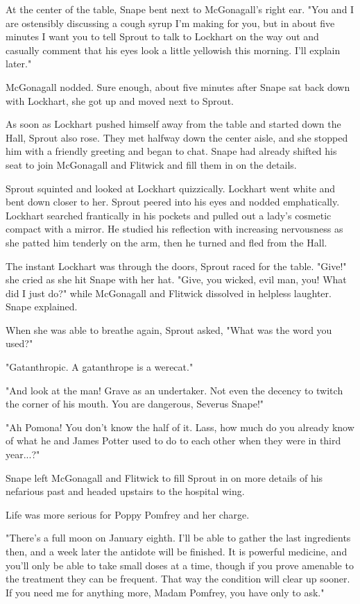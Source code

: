 \documentclass[a4paper,11pt]{article}
\begin{document}
At the center of the table, Snape bent next to McGonagall's right ear. "You and I are ostensibly discussing a cough syrup I'm making for you, but in about five minutes I want you to tell Sprout to talk to Lockhart on the way out and casually comment that his eyes look a little yellowish this morning. I'll explain later."

McGonagall nodded. Sure enough, about five minutes after Snape sat back down with Lockhart, she got up and moved next to Sprout.

As soon as Lockhart pushed himself away from the table and started down the Hall, Sprout also rose. They met halfway down the center aisle, and she stopped him with a friendly greeting and began to chat. Snape had already shifted his seat to join McGonagall and Flitwick and fill them in on the details.

Sprout squinted and looked at Lockhart quizzically. Lockhart went white and bent down closer to her. Sprout peered into his eyes and nodded emphatically. Lockhart searched frantically in his pockets and pulled out a lady's cosmetic compact with a mirror. He studied his reflection with increasing nervousness as she patted him tenderly on the arm, then he turned and fled from the Hall.

The instant Lockhart was through the doors, Sprout raced for the table. "Give!" she cried as she hit Snape with her hat. "Give, you wicked, evil man, you! What did I just do?" while McGonagall and Flitwick dissolved in helpless laughter. Snape explained.

When she was able to breathe again, Sprout asked, "What was the word you used?"

"Gatanthropic. A gatanthrope is a werecat."

"And look at the man! Grave as an undertaker. Not even the decency to twitch the corner of his mouth. You are dangerous, Severus Snape!"

"Ah Pomona! You don't know the half of it. Lass, how much do you already know of what he and James Potter used to do to each other when they were in third year...?"

Snape left McGonagall and Flitwick to fill Sprout in on more details of his nefarious past and headed upstairs to the hospital wing.

Life was more serious for Poppy Pomfrey and her charge.

"There's a full moon on January eighth. I'll be able to gather the last ingredients then, and a week later the antidote will be finished. It is powerful medicine, and you'll only be able to take small doses at a time, though if you prove amenable to the treatment they can be frequent. That way the condition will clear up sooner. If you need me for anything more, Madam Pomfrey, you have only to ask."
\end{document}
